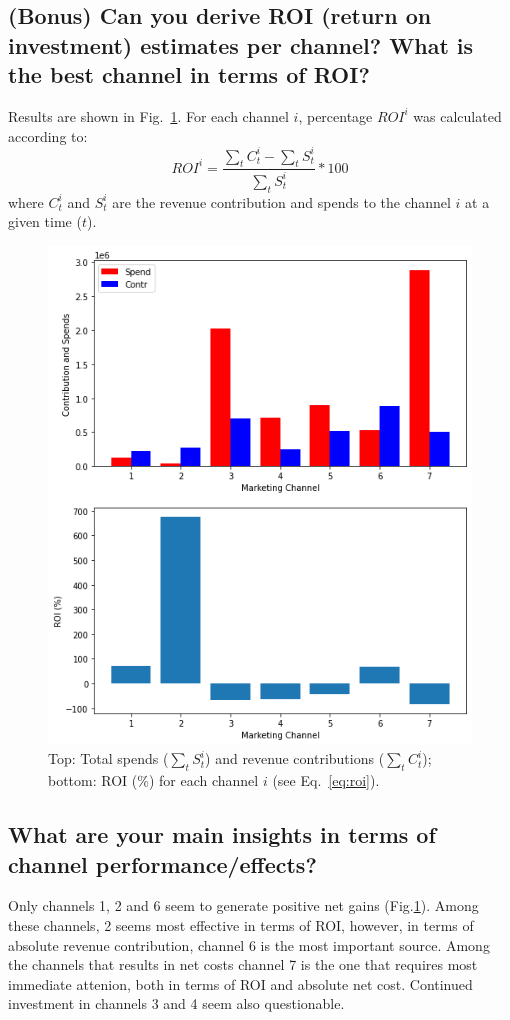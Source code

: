\documentclass[a4paper,10pt]{scrartcl}
\begin{document}
\FloatBarrier

\subsection {(Bonus) Can you derive ROI (return on investment) estimates per channel? What is the best channel in terms of ROI?}
Results are shown in Fig.~\ref{f:CS_ROI}. For each channel $i$, percentage $ROI^i$ was calculated according to:
\begin{equation}\label{eq:roi}
 ROI^i = \frac{\sum_t C_t^i - \sum_t S_t^i}{\sum_t S_t^i} * 100
\end{equation}
where $C_t^i$ and $S_t^i$ are the revenue contribution and spends to the channel $i$ at a given time ($t$).  


\begin{figure}[!h]
  \centering
  \includegraphics[trim=0mm 0mm 0mm 0mm, clip, width=.5\textwidth]{contributions_roi.png}
  \caption{Top: Total spends ($\sum_t S_t^i$) and revenue contributions ($\sum_t C_t^i$); bottom: ROI (\%) for each channel $i$ (see Eq.~\ref{eq:roi}).}\label{f:CS_ROI}
\end{figure}

\FloatBarrier

\subsection {What are your main insights in terms of channel performance/effects?}


Only channels 1, 2 and 6 seem to generate positive net gains (Fig.\ref{f:CS_ROI}). Among these channels, 2 seems most effective in terms of ROI, however, in terms of absolute revenue contribution, channel 6 is the most important source. Among the channels that results in net costs channel 7 is the one that requires most immediate attenion, both in terms of ROI and absolute net cost. Continued investment in channels 3 and 4 seem also questionable.
\end{document}
